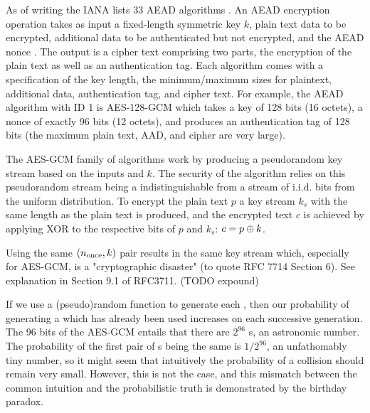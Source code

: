 As of writing the IANA lists 33 AEAD algorithms \cite{iana-aead}. An AEAD encryption operation takes as input a fixed-length symmetric key $k$, plain text data to be encrypted, additional data to be authenticated but not encrypted, and the AEAD nonce \nonce. The output is a cipher text comprising two parts, the encryption of the plain text as well as an authentication tag. Each algorithm comes with a specification of the key length, the minimum/maximum sizes for plaintext, additional data, authentication tag, and cipher text. For example, the AEAD algorithm with ID 1 is AES-128-GCM which takes a key of 128 bits (16 octets), a nonce of exactly 96 bits (12 octets), and produces an authentication tag of 128 bits (the maximum plain text, AAD, and cipher are very large).

The AES-GCM family of algorithms work by producing a pseudorandom key stream based on the inputs \nonce and $k$. The security of the algorithm relies on this pseudorandom stream being a indistinguishable from a stream of i.i.d. bits from the uniform distribution. To encrypt the plain text $p$ a key stream $k_s$ with the same length as the plain text is produced, and the encrypted text $c$ is achieved by applying XOR to the respective bits of $p$ and $k_s$: $c=p\oplus k$.




Using the same $(\nonce, k)$ pair results in the same key stream which, especially for AES-GCM, is a "cryptographic disaster" (to quote RFC 7714 Section 6). See explanation in Section 9.1 of RFC3711. (TODO expound)

If we use a (pseudo)random function to generate each \nonce, then our probability of generating a \nonce which has already been used increases on each successive generation. The 96 bits of the AES-GCM \nonce entails that there are $2^96$ \nonce s, an astronomic number. The probability of the first pair of \nonce s being the same is $1/2^{96}$, an unfathomably tiny number, so it might seem that intuitively the probability of a \nonce collision should remain very small. However, this is not the case, and this mismatch between the common intuition and the probabilistic truth is demonstrated by the birthday paradox.

